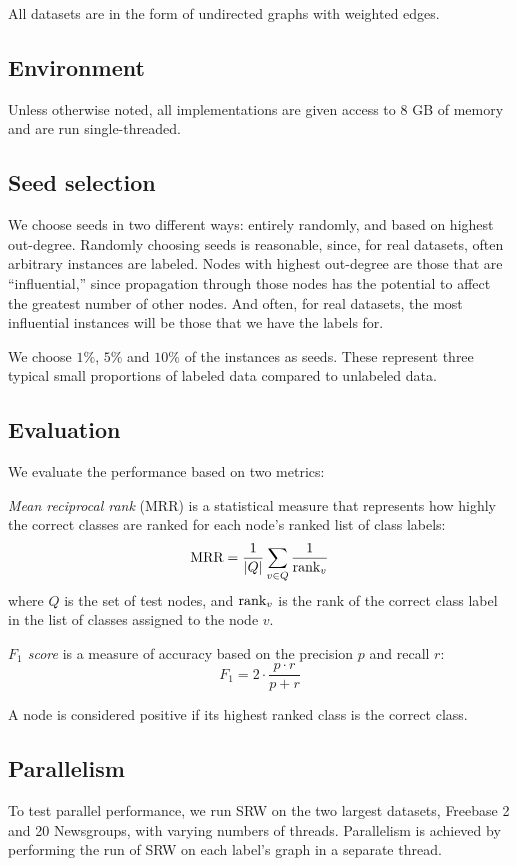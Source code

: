 \documentclass[12pt]{article}
\begin{document}
All datasets are in the form of undirected graphs with weighted edges.

\subsection{Environment}
Unless otherwise noted, all implementations are given access to 8 GB of memory and are run single-threaded.

\subsection{Seed selection}
We choose seeds in two different ways: entirely randomly, and based on highest out-degree.
Randomly choosing seeds is reasonable, since, for real datasets, often arbitrary instances are labeled.
Nodes with highest out-degree are those that are ``influential,'' since propagation through those nodes has the potential to affect the greatest number of other nodes.
And often, for real datasets, the most influential instances will be those that we have the labels for.

We choose $1\%$, $5\%$ and $10\%$ of the instances as seeds. These represent three typical small proportions of labeled data compared to unlabeled data.

\subsection{Evaluation}
We evaluate the performance based on two metrics:

\textit{Mean reciprocal rank} (MRR) is a statistical measure that represents how highly the correct classes are ranked for each node's ranked list of class labels:
$$\textnormal{MRR} = \frac{1}{|Q|} \sum_{v \in Q} \frac{1}{\textnormal{rank}_v}$$
where $Q$ is the set of test nodes, and $\textnormal{rank}_v$ is the rank of the correct class label in the list of classes assigned to the node $v$.

\textit{$F_1$ score} is a measure of accuracy based on the precision $p$ and recall $r$:
$$F_1 = 2 \cdot \frac{p \cdot r}{p + r}$$

A node is considered positive if its highest ranked class is the correct class.

\subsection{Parallelism}
To test parallel performance, we run SRW on the two largest datasets, Freebase 2 and 20 Newsgroups, with varying numbers of threads.
Parallelism is achieved by performing the run of SRW on each label's graph in a separate thread.
\end{document}
